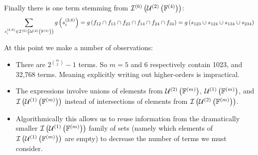 \documentclass[11pt]{article}
\newcommand{\gxn}[1]{g\left(#1\right)}
\newcommand{\iset}[1]{\mathcal{I}\left(#1\right)}
\newcommand{\smem}[2]{s^{\left(#1\right)}_{#2}}
\begin{document}
Finally there is one term stemming from $\mathcal{I}^{(6)}\left(\mathcal{U}^{(2)}\left(\mathbb{F}^{(4)}\right)\right)$:
\begin{align}
    \sum_{\smem{2,6}{i}\in\intsset{6}{2}{4}}\gxn{\smem{2,6}{i}} =
      \gxn{\IDiDjDkDlDmDn} = \gxn{\Iii\cup\Ijj\cup\Ikk\cup\Ill}
\end{align}


At this point we make a number of observations:
\begin{itemize}
	\item There are $2^{m \choose 2} - 1$ terms. So $m=5$ and $6$
	      respectively contain 1023, and 32,768 terms. Meaning explicitly
	      writing out higher-orders is impractical.
	\item The expressions involve unions of elements from $\mathcal{U}^{(2)}\left(\mathbb{F}^{(m)}\right)$,
          $\mathcal{U}^{(1)}\left(\mathbb{F}^{(m)}\right)$, and  $\iset{\unionset{1}{m}}$ instead of
          intersections of elements from $\iset{\unionset{2}{m}}$.
	\item Algorithmically this allows us to reuse information from the
	      dramatically smaller $\iset{\unionset{1}{m}}$ family of sets (namely
          which elements of $\iset{\unionset{1}{m}}$ are empty) to decrease the
          number of terms we must consider.
\end{itemize}
\end{document}
